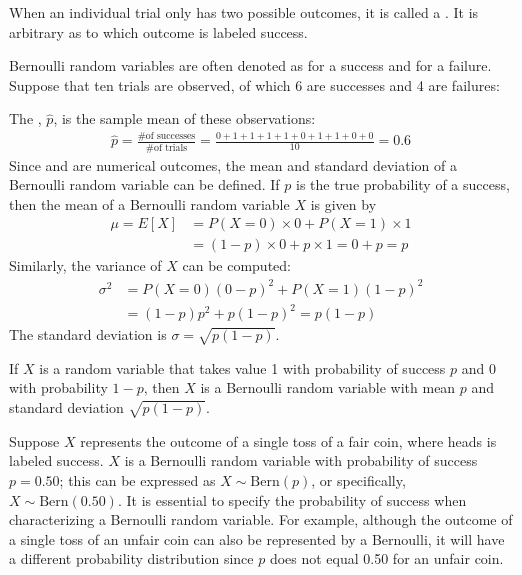 When an individual trial only has two possible outcomes, it is called a . It is arbitrary as to which outcome is labeled success. 

Bernoulli random variables are often denoted as  for a success and  for a failure. Suppose that ten trials are observed, of which 6 are successes and 4 are failures:
\begin{center}
	         
\end{center}
The , $\hat{p}$, is the sample mean of these observations:
\begin{eqnarray*}
	\hat{p} = \frac{\text{\# of successes}}{\text{\# of trials}} = \frac{0+1+1+1+1+0+1+1+0+0}{10} = 0.6
\end{eqnarray*}%
Since  and  are numerical outcomes, the {mean} and {standard deviation} of a Bernoulli random variable can be defined. If ${p}$ is the true probability of a success, then the mean of a Bernoulli random variable $X$ is given by
\begin{align*}
\mu = E[X] &= P(X=0)\times0 + P(X=1)\times1 \\
&= (1-p)\times0 + p\times 1 = 0+p = p
\end{align*}
Similarly, the variance of $X$ can be computed:
\begin{align*}
\sigma^2 &= {P(X=0)(0-p)^2 + P(X=1)(1-p)^2} \\
&= {(1-p)p^2 + p(1-p)^2} = {p(1-p)}
\end{align*}
The standard deviation is $\sigma=\sqrt{p(1-p)}$.

\begin{termBox}{
		If $X$ is a random variable that takes value 1 with probability of success $p$ and 0 with probability $1-p$, then $X$ is a Bernoulli random variable with mean $p$ and standard deviation $\sqrt{p(1-p)}$.
	}
\end{termBox}

Suppose $X$ represents the outcome of a single toss of a fair coin, where heads is labeled success. $X$ is a Bernoulli random variable with probability of success $p = 0.50$; this can be expressed as $X \sim \textrm{Bern}(p)$, or specifically, $X \sim \textrm{Bern}(0.50)$. It is essential to specify the probability of success when characterizing a Bernoulli random variable. For example, although the outcome of a single toss of an unfair coin can also be represented by a Bernoulli, it will have a different probability distribution since $p$ does not equal 0.50 for an unfair coin. 

